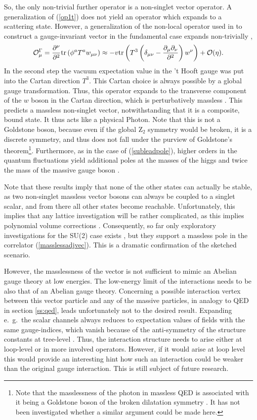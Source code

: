 \documentclass[final,twoside,12pt]{article}
\newcommand*{\no}{\noindent}
\newcommand*{\be}{\begin{equation}}
\newcommand*{\ee}{\end{equation}}
\newcommand*{\pd}{\partial}
\newcommand*{\pdm}{\pd_{\mu}}
\newcommand*{\pdn}{\pd_{\nu}}
\newcommand*{\pref}[1]{(\ref{#1})}
\newcommand*{\mn}{{\mu\nu}}
\newcommand*{\tr}{\mathrm{tr}}
\newcommand*{\1}{1\!\!\!\bot}
\newcommand*{\op}{{\cal O}}
\begin{document}
So, the only non-trivial further operator is a non-singlet vector operator. A generalization of \pref{op1t} does not yield an operator which expands to a scattering state. However, a generalization of the non-local operator used in \cite{Frohlich:1981yi} to construct a gauge-invariant vector in the fundamental case expands non-trivially \cite{Maas:2017xzh},
\be
\op^\Gamma_\mu=\frac{\pd^\nu}{\pd^2}\tr\left(\phi^a T^aw_\mn\right)\approx-v\tr\left(T^3\left(\delta_\mn-\frac{\pdm\pdn}{\pd^2}\right)w^\nu\right)+\op(\eta)\label{masslessadjvec}.
\ee
\no In the second step the vacuum expectation value in the 't Hooft gauge was put into the Cartan direction $T^3$. This Cartan choice is always possible by a global gauge transformation. Thus, this operator expands to the transverse component of the $w$ boson in the Cartan direction, which is perturbatively massless \cite{Maas:2017xzh,O'Raifeartaigh:1986vq}. This predicts a massless non-singlet vector, notwithstanding that it is a composite, bound state. It thus acts like a physical Photon. Note that this is not a Goldstone boson, because even if the global Z$_2$ symmetry would be broken, it is a discrete symmetry, and thus does not fall under the purview of Goldstone's theorem\footnote{Note that the masslessness of the photon in massless QED is associated with it being a Goldstone boson of the broken dilatation symmetry \cite{Alkofer:2000wg,Lenz:1994tc}. It has not been investigated whether a similar argument could be made here.}. Furthermore, as in the case of \pref{subleadpole}, higher orders in the quantum fluctuations yield additional poles at the masses of the higgs and twice the mass of the massive gauge boson \cite{Maas:2017xzh}.

Note that these results imply that none of the other states can actually be stable, as two non-singlet massless vector bosons can always be coupled to a singlet scalar, and from there all other states become reachable. Unfortunately, this implies that any lattice investigation will be rather complicated, as this implies polynomial volume corrections \cite{Gattringer:2010zz,Luscher:1985dn}. Consequently, so far only exploratory investigations for the SU(2) case exists \cite{Lee:1985yi}, but they support a massless pole in the correlator \pref{masslessadjvec}. This is a dramatic confirmation of the sketched scenario.

However, the masslessness of the vector is not sufficient to mimic an Abelian gauge theory at low energies. The low-energy limit of the interactions needs to be also that of an Abelian gauge theory. Concerning a possible interaction vertex between this vector particle and any of the massive particles, in analogy to QED in section \ref{ss:qed}, leads unfortunately not to the desired result. Expanding e.\ g.\ the scalar channels always reduces to expectation values of fields with the same gauge-indices, which vanish because of the anti-symmetry of the structure constants at tree-level \cite{Sondenheimer:pc}. Thus, the interaction structure needs to arise either at loop-level or in more involved operators. However, if it would arise at loop level this would provide an interesting hint how such an interaction could be weaker than the original gauge interaction. This is still subject of future research.
\end{document}
